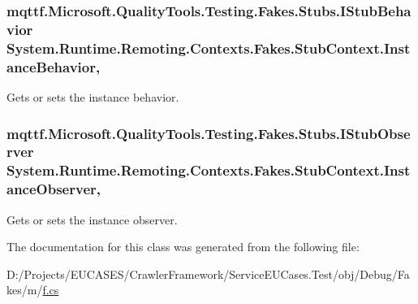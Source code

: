 \hypertarget{class_system_1_1_runtime_1_1_remoting_1_1_contexts_1_1_fakes_1_1_stub_context_a94ce3b502f8b0c59d135e178fad34b57}{
\subsubsection[{Instance\-Behavior}]{\setlength{\rightskip}{0pt plus 5cm}mqttf.\-Microsoft.\-Quality\-Tools.\-Testing.\-Fakes.\-Stubs.\-I\-Stub\-Behavior System.\-Runtime.\-Remoting.\-Contexts.\-Fakes.\-Stub\-Context.\-Instance\-Behavior\hspace{0.3cm}{\ttfamily [get]}, {\ttfamily [set]}}}\label{class_system_1_1_runtime_1_1_remoting_1_1_contexts_1_1_fakes_1_1_stub_context_a94ce3b502f8b0c59d135e178fad34b57}


Gets or sets the instance behavior.

\hypertarget{class_system_1_1_runtime_1_1_remoting_1_1_contexts_1_1_fakes_1_1_stub_context_a2851540b6360fa5c35224e9cf10e5efa}{
\subsubsection[{Instance\-Observer}]{\setlength{\rightskip}{0pt plus 5cm}mqttf.\-Microsoft.\-Quality\-Tools.\-Testing.\-Fakes.\-Stubs.\-I\-Stub\-Observer System.\-Runtime.\-Remoting.\-Contexts.\-Fakes.\-Stub\-Context.\-Instance\-Observer\hspace{0.3cm}{\ttfamily [get]}, {\ttfamily [set]}}}\label{class_system_1_1_runtime_1_1_remoting_1_1_contexts_1_1_fakes_1_1_stub_context_a2851540b6360fa5c35224e9cf10e5efa}


Gets or sets the instance observer.



The documentation for this class was generated from the following file\-:\begin{DoxyCompactItemize}
\item 
D\-:/\-Projects/\-E\-U\-C\-A\-S\-E\-S/\-Crawler\-Framework/\-Service\-E\-U\-Cases.\-Test/obj/\-Debug/\-Fakes/m/\hyperlink{m_2f_8cs}{f.\-cs}\end{DoxyCompactItemize}
